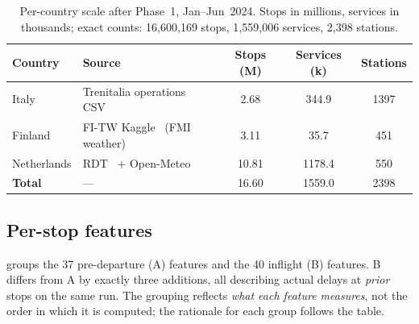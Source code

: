 \begin{table}[H]
    \centering
    \caption{Per-country scale after Phase~1, Jan--Jun~2024. Stops in millions, services in thousands; exact counts: 16{,}600{,}169 stops, 1{,}559{,}006 services, 2{,}398 stations.}
    \label{tab:data-sources}
    \footnotesize
    \setlength{\tabcolsep}{8pt}
    \begin{tabularx}{\textwidth}{l X
        S[table-format=2.2, round-mode=places, round-precision=2]
        S[table-format=4.1, round-mode=places, round-precision=1]
        S[table-format=4.0, group-minimum-digits=4]}
        \toprule
        Country & Source & {Stops (M)} & {Services (k)} & {Stations} \\
        \midrule
        Italy        & Trenitalia operations CSV~\cite{trenitalia2025figshare}                       &  2.68 &  344.9 & 1397 \\
        Finland      & FI-TW Kaggle~\cite{borin2025fitw} (FMI weather)                                 &  3.11 &   35.7 &  451 \\
        Netherlands  & RDT~\cite{rdt2024opendata} + Open-Meteo~\cite{zippenfenig2023openmeteo}        & 10.81 & 1178.4 &  550 \\
        \midrule
        \textbf{Total} & ---                                                                          & 16.60 & 1559.0 & 2398 \\
        \bottomrule
    \end{tabularx}
\end{table}

\subsection{Per-stop features}

 groups the 37 pre-departure (A) features and the 40 inflight (B) features. B differs from A by exactly three additions, all describing actual delays at \emph{prior} stops on the same run. The grouping reflects \emph{what each feature measures}, not the order in which it is computed; the rationale for each group follows the table.

